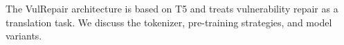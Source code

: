 The VulRepair architecture is based on T5 and treats vulnerability repair as a translation task. We discuss the tokenizer, pre-training strategies, and model variants.
